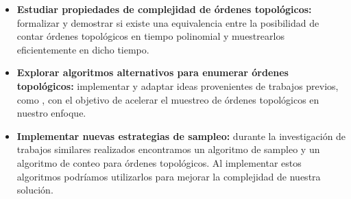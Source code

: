 \begin{itemize}
  \item \textbf{Estudiar propiedades de complejidad de órdenes topológicos:} formalizar y demostrar si existe una equivalencia entre la posibilidad de contar órdenes topológicos en tiempo polinomial y muestrearlos eficientemente en dicho tiempo.

  \item \textbf{Explorar algoritmos alternativos para enumerar órdenes topológicos:} implementar y adaptar ideas provenientes de trabajos previos, como \cite{efficientToposort}, con el objetivo de acelerar el muestreo de órdenes topológicos en nuestro enfoque.

  \item \textbf{Implementar nuevas estrategias de sampleo:} durante la investigación de trabajos similares realizados encontramos un algoritmo de sampleo \cite{HUBER2006420} y un algoritmo de conteo \cite{efficientCountingOfToposorts} para órdenes topológicos. Al implementar estos algoritmos podríamos utilizarlos para mejorar la complejidad de nuestra solución. 
\end{itemize}

